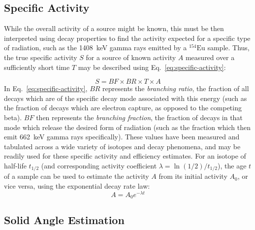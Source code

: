 \documentclass[12pt]{article}
\newcommand{\EuSrc}{$\mathrm{^{154}Eu}$\xspace}
\begin{document}
\subsection{Specific Activity}
While the overall activity of a source might be known, this must be then interpreted using decay properties to find the activity expected for a specific type of radiation, such as the 1408~keV gamma rays emitted by a \EuSrc sample.
Thus, the true specific activity $S$ for a source of known activity $A$ measured over a sufficiently short time $T$ may be described using Eq.~\ref{eq:specific-activity}:

\begin{equation}
    \label{eq:specific-activity}
    S = BF \times BR \times T \times A
\end{equation}
In Eq.~\ref{eq:specific-activity}, $BR$ represents the \emph{branching ratio}, the fraction of all decays which are of the specific decay mode associated with this energy (such as the fraction of decays which are electron capture, as opposed to the competing beta).
$BF$ then represents the \emph{branching fraction}, the fraction of decays in that mode which release the desired form of radiation (such as the fraction which then emit 662~keV gamma rays specifically).
These values have been measured and tabulated across a wide variety of isotopes and decay phenomena, and may be readily used for these specific activity and efficiency estimates.
For an isotope of half-life $t_{1/2}$ (and corresponding activity coefficient $\lambda=\ln(1/2)/t_{1/2}$), the age $t$ of a sample can be used to estimate the activity $A$ from its initial activity $A_0$, or vice versa, using the exponential decay rate law\cite{tsoulfanidis_measurement_2015}:
\begin{equation}
    \label{eq:exp-decay}
    A=A_0e^{-\lambda t}
\end{equation}

\subsection{Solid Angle Estimation}
\end{document}

